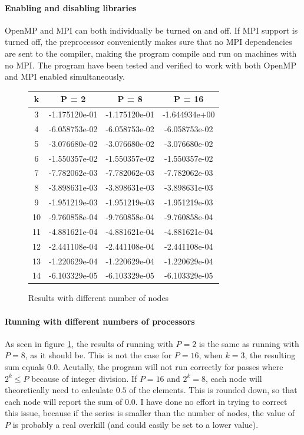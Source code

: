\documentclass{article}
\begin{document}
\paragraph{Enabling and disabling libraries}
OpenMP and MPI can both individually be turned on and off. If MPI support is turned off, the preprocessor conveniently makes sure that no MPI dependencies are sent to the compiler, making the program compile and run on machines with no MPI. The program have been tested and verified to work with both OpenMP and MPI enabled simultaneously.
\begin{figure}[h]
	\centering
\begin{tabular}{c | c c c}
	\hline
	k & P = 2 & P = 8 & P = 16 \\
	\hline
	\hline
	3 	& -1.175120e-01 & -1.175120e-01 & -1.644934e+00 \\
	4 	& -6.058753e-02 & -6.058753e-02 & -6.058753e-02 \\
	5 	& -3.076680e-02 & -3.076680e-02 & -3.076680e-02 \\
	6	& -1.550357e-02 & -1.550357e-02 & -1.550357e-02 \\
	7	& -7.782062e-03 & -7.782062e-03 & -7.782062e-03 \\
	8	& -3.898631e-03 & -3.898631e-03 & -3.898631e-03 \\
	9	& -1.951219e-03 & -1.951219e-03 & -1.951219e-03 \\
	10	& -9.760858e-04 & -9.760858e-04 & -9.760858e-04 \\
	11	& -4.881621e-04 & -4.881621e-04 & -4.881621e-04 \\
	12	& -2.441108e-04 & -2.441108e-04 & -2.441108e-04 \\
	13	& -1.220629e-04 & -1.220629e-04 & -1.220629e-04 \\
	14	& -6.103329e-05 & -6.103329e-05 & -6.103329e-05 \\
	\hline
	
\end{tabular}
\caption{Results with different number of nodes}
\label{fig:results}
\end{figure}

\paragraph{Running with different numbers of processors}
As seen in figure \ref{fig:results}, the results of running with $P=2$ is the same as running with $P=8$, as it should be. This is not the case for $P=16$, when $k=3$, the resulting sum equals $0.0$. Acutally, the program will not run correctly for passes where $2^k \le P$ because of integer division. If $P=16$ and $2^k=8$, each node will theoretically need to calculate $0.5$ of the elements. This is rounded down, so that each node will report the sum of $0.0$. I have done no effort in trying to correct this issue, because if the series is smaller than the number of nodes, the value of $P$ is probably a real overkill (and could easily be set to a lower value).
\end{document}
